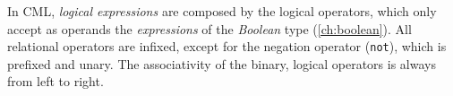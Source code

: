 In CML, \emph{logical expressions} are composed by the logical operators,
which only accept as operands
the \emph{expressions} of the \emph{Boolean} type (\ref{ch:boolean}).
All relational operators are infixed,
except for the negation operator (\verb|not|),
which is prefixed and unary.
The associativity of the binary, logical operators is always from left to right.
